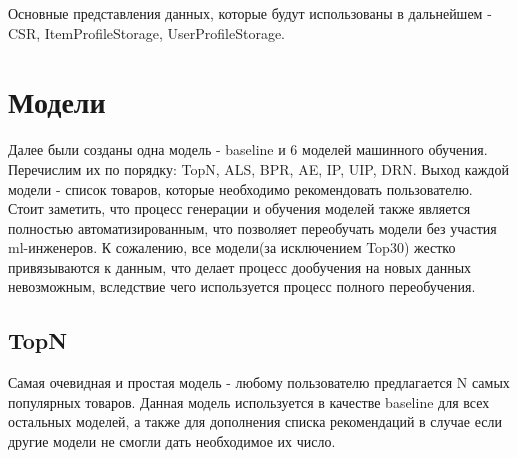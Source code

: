 \documentclass[14pt]{mmcs_article}
\begin{document}
Основные представления данных, которые будут использованы в дальнейшем - CSR, ItemProfileStorage, UserProfileStorage.


\section{Модели}\label{dsfs}
Далее были созданы одна модель - baseline и 6 моделей машинного обучения. Перечислим их по порядку: TopN, ALS, BPR, AE, IP, UIP, DRN. Выход каждой модели - список товаров, которые необходимо рекомендовать пользователю. \\
Стоит заметить, что процесс генерации и обучения моделей также является полностью автоматизированным, что позволяет переобучать модели без участия ml-инженеров. К сожалению, все модели(за исключением Top30) жестко привязываются к данным, что делает процесс дообучения на новых данных невозможным, вследствие чего используется процесс полного переобучения.
\subsection{TopN}
Самая очевидная и простая модель - любому пользователю предлагается N самых популярных товаров. Данная модель используется в качестве baseline для всех остальных моделей, а также для дополнения списка рекомендаций в случае если другие модели не смогли дать необходимое их число.
\end{document}
